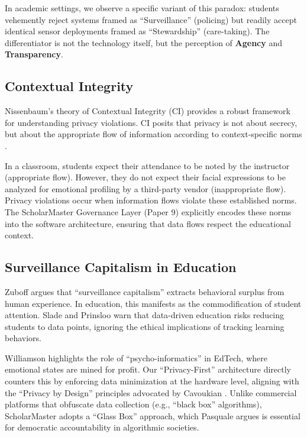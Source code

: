 \documentclass[conference]{IEEEtran}
\begin{document}
In academic settings, we observe a specific variant of this paradox: students vehemently reject systems framed as ``Surveillance'' (policing) but readily accept identical sensor deployments framed as ``Stewardship'' (care-taking). The differentiator is not the technology itself, but the perception of \textbf{Agency} and \textbf{Transparency}.

\subsection{Contextual Integrity}
Nissenbaum's theory of Contextual Integrity (CI) provides a robust framework for understanding privacy violations. CI posits that privacy is not about secrecy, but about the appropriate flow of information according to context-specific norms \cite{b4}.

In a classroom, students expect their attendance to be noted by the instructor (appropriate flow). However, they do not expect their facial expressions to be analyzed for emotional profiling by a third-party vendor (inappropriate flow). Privacy violations occur when information flows violate these established norms. The ScholarMaster Governance Layer (Paper 9) explicitly encodes these norms into the software architecture, ensuring that data flows respect the educational context.

\subsection{Surveillance Capitalism in Education}
Zuboff \cite{b10} argues that ``surveillance capitalism'' extracts behavioral surplus from human experience. In education, this manifests as the commodification of student attention. Slade and Prinsloo \cite{b11} warn that data-driven education risks reducing students to data points, ignoring the ethical implications of tracking learning behaviors. 

Williamson \cite{b12} highlights the role of ``psycho-informatics'' in EdTech, where emotional states are mined for profit. Our ``Privacy-First'' architecture directly counters this by enforcing data minimization at the hardware level, aligning with the ``Privacy by Design'' principles advocated by Cavoukian \cite{b13}. Unlike commercial platforms that obfuscate data collection (e.g., ``black box'' algorithms), ScholarMaster adopts a ``Glass Box'' approach, which Pasquale \cite{b14} argues is essential for democratic accountability in algorithmic societies.
\end{document}
